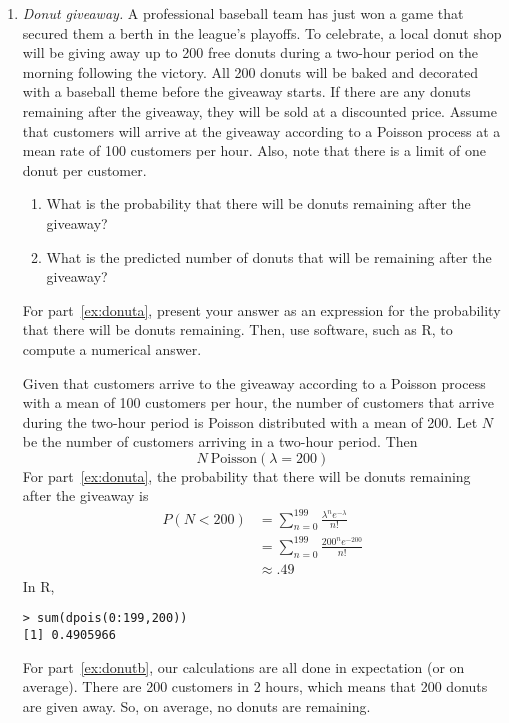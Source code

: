 \begin{enumerate}
\item \emph{Donut giveaway.}  A professional baseball team has just
  won a game that secured them a berth in the league’s playoffs. To
  celebrate, a local donut shop will be giving away up to 200 free
  donuts during a two-hour period on the morning following the
  victory. All 200 donuts will be baked and decorated with a baseball
  theme before the giveaway starts. If there are any donuts remaining
  after the giveaway, they will be sold at a discounted price. Assume
  that customers will arrive at the giveaway according to a Poisson
  process at a mean rate of 100 customers per hour. Also, note that
  there is a limit of one donut per customer.
\begin{enumerate}
	\item What is the probability that there will be donuts remaining after the giveaway? \label{ex:donuta}
	\item What is the predicted number of donuts that will be remaining after the giveaway? \label{ex:donutb}
\end{enumerate}

For part~\ref{ex:donuta}, present your answer as an expression for the
probability that there will be donuts remaining. Then, use software,
such as R, to compute a numerical answer.

\begin{solution}
  \bs Given that customers arrive to the giveaway according to a
  Poisson process with a mean of 100 customers per hour, the number of
  customers that arrive during the two-hour period is Poisson
  distributed with a mean of 200. Let $N$ be the number of customers
  arriving in a two-hour period. Then
\[ N ~ \text{Poisson}(\lambda = 200) \]
For part~\ref{ex:donuta}, the probability that there will be donuts remaining after the giveaway is 
\begin{align*}
      P(N < 200) &= \sum_{n=0}^{199} \frac{\lambda^n e^{-\lambda}}{n!}\\
      &= \sum_{n=0}^{199} \frac{200^n e^{-200}}{n!}\\
      &\approx .49
\end{align*}
In R,
\begin{Verbatim}
> sum(dpois(0:199,200))
[1] 0.4905966
\end{Verbatim}  

For part~\ref{ex:donutb}, our calculations are all done in expectation
(or on average). There are 200 customers in 2 hours, which means that
200 donuts are given away. So, on average, no donuts are remaining.
\end{solution}


\end{enumerate}
